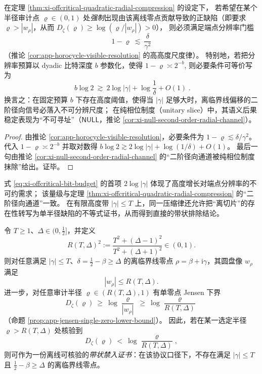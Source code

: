 \begin{corollary}\label{cor:xi-offcritical-visibility-threshold-bit-budget}
在定理 \ref{thm:xi-offcritical-quadratic-radial-compression} 的设定下，
若希望在某个半径审计点 \(\varrho\in(0,1)\) 处\emph{强制}出现由该离线零点贡献导致的正缺陷（即要求 \(\varrho>|w_\rho|\)，从而 \(D_\zeta(\varrho)\ge \log(\varrho/|w_\rho|)>0\)），
则必须满足端点分辨率门槛
\[
1-\varrho\ \lesssim\ \frac{\delta}{\gamma^2}
\]
（推论 \ref{cor:app-horocycle-visible-resolution} 的高高度尺度律）。
特别地，若把分辨率预算以 dyadic 比特深度 \(b\) 参数化，使得
\(
1-\varrho\asymp 2^{-b}
\),
则必要条件可等价写为
\begin{equation}\label{eq:xi-offcritical-bit-budget}
\boxed{\;
b\log 2\ \gtrsim\ 2\log|\gamma|+\log\frac{1}{\delta}+O(1)\; }.
\end{equation}
换言之：在固定预算 \(b\) 下存在高度阈值，使得当 \(|\gamma|\) 足够大时，离临界线偏移的二阶径向信号必落入不可分辨尺度；
在纯相位制度（unitary slice）中，其语义后果稳定表现为“不可寻址”（\(\mathsf{NULL}\)，推论 \ref{cor:xi-null-second-order-radial-channel}）。
\end{corollary}

\begin{proof}
由推论 \ref{cor:app-horocycle-visible-resolution}，必要条件为 \(1-\varrho\lesssim \delta/\gamma^2\)。
代入 \(1-\varrho\asymp 2^{-b}\) 并取对数得
\(
b\log 2\gtrsim 2\log|\gamma|+\log(1/\delta)+O(1)
\)。
最后一句由推论 \ref{cor:xi-null-second-order-radial-channel} 的“二阶径向通道被纯相位制度抹除”给出。证毕。
\end{proof}

式 \eqref{eq:xi-offcritical-bit-budget} 的首项 \(2\log|\gamma|\) 体现了高度增长对端点分辨率的不可约需求；
该量级与定理 \ref{thm:xi-offcritical-quadratic-radial-compression} 的“二阶径向通道”一致。
在有限高度带 \(|\gamma|\le T\) 上，同一压缩律还允许把“离切片”的存在性转写为单半径缺陷的不等式证书，从而得到直接的带状排除结论。

\begin{theorem}\label{thm:xi-jensen-single-radius-band-exclusion}
令 \(T\ge 1\)、\(\Delta\in(0,\tfrac12]\)，并定义
\[
  R(T,\Delta)^2:=\frac{T^2+(\Delta-1)^2}{T^2+(\Delta+1)^2}\in(0,1).
\]
则对任意满足 \(|\gamma|\le T\)、\(\delta=\tfrac12-\beta\ge\Delta\) 的离临界线零点 \(\rho=\beta+\mathrm{i}\gamma\)，其圆盘像 \(w_\rho\) 满足
\[
  |w_\rho|\le R(T,\Delta).
\]
进一步，对任意审计半径 \(\varrho\in(R(T,\Delta),1)\) 有单零点 Jensen 下界
\[
  D_\zeta(\varrho)\ \ge\ \log\frac{\varrho}{|w_\rho|}\ \ge\ \log\frac{\varrho}{R(T,\Delta)}
\]
（命题 \ref{prop:app-jensen-single-zero-lower-bound}）。
因此，若在某一选定半径 \(\varrho>R(T,\Delta)\) 处核验到
\[
  D_\zeta(\varrho)\ <\ \log\frac{\varrho}{R(T,\Delta)},
\]
则可作为一份离线可核验的\emph{带状禁入证书}：在该协议口径下，不存在满足 \(|\gamma|\le T\) 且 \(\tfrac12-\beta\ge\Delta\) 的离临界线零点。
\end{theorem}

